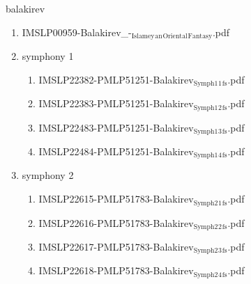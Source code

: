 \documentclass[11pt]{article}
\begin{document}
\item balakirev
\label{sec-1-1-1-1-44-7}
\begin{enumerate}
\item IMSLP00959-Balakirev\_-$_{\text{Islamey}}$$_{\text{an}}$$_{\text{Oriental}}$$_{\text{Fantasy}}$.pdf
\label{sec-1-1-1-1-44-7-1}

\item symphony 1
\label{sec-1-1-1-1-44-7-2}
\begin{enumerate}
\item IMSLP22382-PMLP51251-Balakirev$_{\text{Symph1}}$$_{\text{1}}$$_{\text{fs}}$.pdf
\label{sec-1-1-1-1-44-7-2-1}

\item IMSLP22383-PMLP51251-Balakirev$_{\text{Symph1}}$$_{\text{2}}$$_{\text{fs}}$.pdf
\label{sec-1-1-1-1-44-7-2-2}

\item IMSLP22483-PMLP51251-Balakirev$_{\text{Symph1}}$$_{\text{3}}$$_{\text{fs}}$.pdf
\label{sec-1-1-1-1-44-7-2-3}

\item IMSLP22484-PMLP51251-Balakirev$_{\text{Symph1}}$$_{\text{4}}$$_{\text{fs}}$.pdf
\label{sec-1-1-1-1-44-7-2-4}
\end{enumerate}

\item symphony 2
\label{sec-1-1-1-1-44-7-3}
\begin{enumerate}
\item IMSLP22615-PMLP51783-Balakirev$_{\text{Symph2}}$$_{\text{1}}$$_{\text{fs}}$.pdf
\label{sec-1-1-1-1-44-7-3-1}

\item IMSLP22616-PMLP51783-Balakirev$_{\text{Symph2}}$$_{\text{2}}$$_{\text{fs}}$.pdf
\label{sec-1-1-1-1-44-7-3-2}

\item IMSLP22617-PMLP51783-Balakirev$_{\text{Symph2}}$$_{\text{3}}$$_{\text{fs}}$.pdf
\label{sec-1-1-1-1-44-7-3-3}

\item IMSLP22618-PMLP51783-Balakirev$_{\text{Symph2}}$$_{\text{4}}$$_{\text{fs}}$.pdf
\label{sec-1-1-1-1-44-7-3-4}
\end{enumerate}
\end{enumerate}
\end{document}
